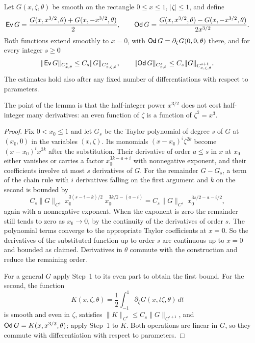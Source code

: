 \begin{lemma}
\label{lem:rewrite-root-composition}
Let $G(x,\zeta,\theta)$ be smooth on the rectangle $0\le x\le1$,
$|\zeta|\le1$, and define
\[
 \mathsf{Ev}\,G=\frac{G(x,x^{3/2},\theta)+G(x,-x^{3/2},\theta)}2,\qquad
 \mathsf{Od}\,G=\frac{G(x,x^{3/2},\theta)-G(x,-x^{3/2},\theta)}
                         {2x^{3/2}} .
\]
Both functions extend smoothly to $x=0$, with
$\mathsf{Od}\,G=\partial_\zeta G(0,0,\theta)$ there, and for every integer
$s\ge0$
\begin{equation}\label{eq:rewrite-root-composition-bound}
 \|\mathsf{Ev}\,G\|_{C^s_{x,\theta}}\le C_s\|G\|_{C^s_{x,\zeta,\theta}},
 \qquad
 \|\mathsf{Od}\,G\|_{C^s_{x,\theta}}
                       \le C_s\|G\|_{C^{s+1}_{x,\zeta,\theta}} .
\end{equation}
The estimates hold also after any fixed number of differentiations
with respect to parameters.
\end{lemma}

The point of the lemma is that the half-integer power $x^{3/2}$ does
not cost half-integer many derivatives: an even function of $\zeta$
is a function of $\zeta^2=x^3$.

\begin{proof}
Fix $0<x_0\le1$ and let $G_s$ be the Taylor polynomial of degree $s$
of $G$ at $(x_0,0)$ in the variables $(x,\zeta)$. Its monomials
$(x-x_0)^i\zeta^{2k}$ become $(x-x_0)^ix^{3k}$ after the
substitution. Their derivative of order $a\le s$ in $x$ at $x_0$
either vanishes or carries a factor $x_0^{3k-a+i}$ with nonnegative
exponent, and their coefficients involve at most $s$ derivatives of
$G$. For the remainder $G-G_s$, a term of the chain rule with $i$
derivatives falling on the first argument and $k$ on the second is
bounded by
\[
 C_s\|G\|_{C^s}\;
 x_0^{3(s-i-k)/2}\;x_0^{3k/2-(a-i)}
 =C_s\|G\|_{C^s}\;x_0^{3s/2-a-i/2},
\]
again with a nonnegative exponent. When the exponent is zero the
remainder still tends to zero as $x_0\to0$, by the continuity of the
derivatives of order $s$. The polynomial terms converge to the
appropriate Taylor coefficients at $x=0$. So the derivatives of the
substituted function up to order $s$ are continuous up to $x=0$ and
bounded as claimed. Derivatives in $\theta$ commute with the
construction and reduce the remaining order.

For a general $G$ apply Step~1 to its even part to obtain the first
bound. For the second, the function
\[
 K(x,\zeta,\theta)
 =\frac12\int_{-1}^1\partial_\zeta G(x,t\zeta,\theta)\,dt
\]
is smooth and even in $\zeta$, satisfies
$\|K\|_{C^s}\le C_s\|G\|_{C^{s+1}}$, and
$\mathsf{Od}\,G=K(x,x^{3/2},\theta)$; apply Step~1 to $K$. Both operations
are linear in $G$, so they commute with differentiation with respect
to parameters.
\end{proof}


